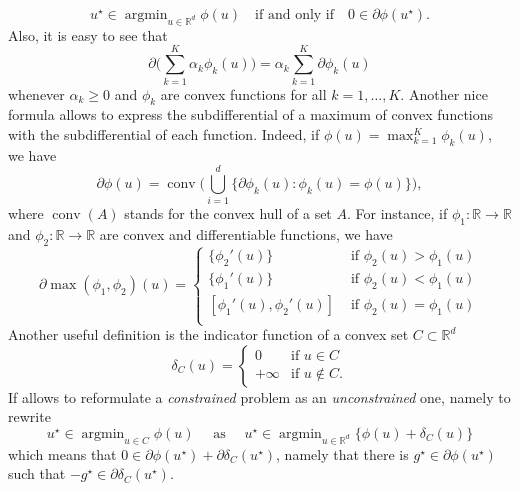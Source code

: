 \documentclass[
	fontsize=11pt, %
	twoside=false, %
	numbers=noenddot, %
]{kaobook}
\DeclareMathOperator*{\argmin}{argmin}
\newcommand{\R}{\mathbb R}
\DeclareMathOperator{\conv}{conv}
\begin{document}
\begin{equation*}
	u^\star \in \argmin_{u \in \R^d} \phi(u) \quad \text{if and only if} \quad 0 \in \partial \phi(u^\star).
\end{equation*}
Also, it is easy to see that
\begin{equation*}
	\partial \Big( \sum_{k=1}^K \alpha_k \phi_k(u) \Big) =  \alpha_k \sum_{k=1}^K \partial \phi_k(u)
\end{equation*}
whenever $\alpha_k \geq 0$ and $\phi_k$ are convex functions for all $k=1, \ldots, K$.
Another nice formula allows to express the subdifferential of a maximum of convex functions with the subdifferential of each function.
Indeed, if $\phi(u) = \max_{k=1}^K \phi_k(u)$, we have
\begin{equation}
	\label{eq:subdifferential-max}
	\partial \phi(u) = \conv\Big( \bigcup_{i=1}^d \Big\{ \partial \phi_k(u) : \phi_k(u) = \phi(u) \Big\} \Big),
\end{equation}
where $\conv(A)$ stands for the convex hull of a set $A$.
For instance, if $\phi_1 : \R \rightarrow \R$ and $\phi_2 : \R \rightarrow \R$ are convex and differentiable functions, we have
\begin{equation*}
	\partial \max(\phi_1, \phi_2)(u) = 
	\begin{cases}
	\{ \phi_2'(u) \} &\text{ if } \phi_2(u) > \phi_1(u) \\
	\{ \phi_1'(u) \} &\text{ if } \phi_2(u) < \phi_1(u) \\
	[ \phi_1'(u), \phi_2'(u) ] &\text{ if } \phi_2(u) = \phi_1(u) \\
	\end{cases}
\end{equation*}
Another useful definition is the indicator function of a convex set $C \subset \R^d$
\begin{equation*}
	\delta_C(u) = \begin{cases}
		0 &\text{if } u \in C \\
		+\infty &\text{if } u \notin C.
	\end{cases}
\end{equation*}
If allows to reformulate a \emph{constrained} problem as an \emph{unconstrained} one, namely to rewrite
\begin{equation*}
	u^\star \in \argmin_{u \in C} \phi(u) \quad \text{ as } \quad u^\star \in \argmin_{u \in \R^d} \{ \phi(u) + \delta_C(u) \}
\end{equation*}
which means that $0 \in \partial \phi(u^\star) + \partial \delta_C(u^\star)$, namely that there is $g^\star \in \partial \phi(u^\star)$ such that $-g^\star \in \partial \delta_C(u^\star)$.
\end{document}
